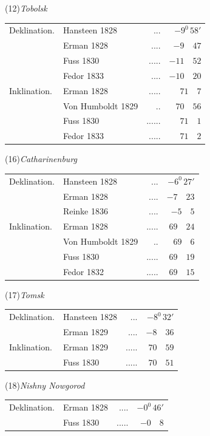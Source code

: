 \begin{center}
\begin{minipage}[t]{\linewidth}\centering
(12)\quad\textit{Tobolsk}\par\smallskip
\begin{tabular}{llrr}
Deklination.&Hansteen 1828&.\quad.\quad.&$-9^0\,58'$\\
&Erman 1828&.\quad.\quad.\quad.&$-9\quad47$\\
&Fuss 1830&.\quad.\quad.\quad.\quad.&$-11\quad52$\\
&Fedor 1833&.\quad.\quad.\quad.&$-10\quad20$\\
Inklination.&Erman 1828&.\quad.\quad.\quad.\quad.&$71\quad7$\\
&Von Humboldt 1829&.\quad.&$70\quad56$\\
&Fuss 1830&.\quad.\quad.\quad.\quad.\quad.&$71\quad1$\\
&Fedor 1833&.\quad.\quad.\quad.\quad.&$71\quad2$
\end{tabular}
\end{minipage}\par\medskip
\begin{minipage}[t]{\linewidth}\centering
(16)\quad\textit{Catharinenburg}\par\smallskip
\begin{tabular}{llrr}
Deklination.&Hansteen 1828&.\quad.\quad.&$-6^0\,27'$\\
&Erman 1828&.\quad.\quad.\quad.&$-7\quad23$\\
&Reinke 1836&.\quad.\quad.\quad.&$-5\quad5$\\
Inklination.&Erman 1828&.\quad.\quad.\quad.\quad.&$69\quad24$\\
&Von Humboldt 1829&.\quad.&$69\quad6$\\
&Fuss 1830&.\quad.\quad.\quad.\quad.&$69\quad19$\\
&Fedor 1832&.\quad.\quad.\quad.\quad.&$69\quad15$
\end{tabular}
\end{minipage}\par\medskip
\begin{minipage}[t]{\linewidth}\centering
(17)\quad\textit{Tomsk}\par\smallskip
\begin{tabular}{llrr}
Deklination.&Hansteen 1828&.\quad.\quad.&$-8^0\,32'$\\
&Erman 1829&.\quad.\quad.\quad.&$-8\quad36$\\
Inklination.&Erman 1829&.\quad.\quad.\quad.\quad.&$70\quad59$\\
&Fuss 1830&.\quad.\quad.\quad.\quad.&$70\quad51$
\end{tabular}
\end{minipage}\par\medskip
\begin{minipage}[t]{\linewidth}\centering
(18)\quad\textit{Nishny Nowgorod}\par\smallskip
\begin{tabular}{llrr}
Deklination.&Erman 1828&.\quad.\quad.\quad.&$-0^0\,46'$\\
&Fuss 1830&.\quad.\quad.\quad.\quad.&$-0\quad8$
\end{tabular}
\end{minipage}
\end{center}
